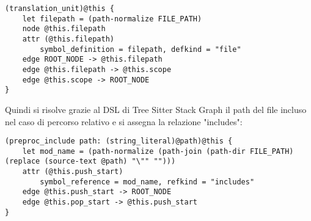 \begin{lstlisting}
(translation_unit)@this {
    let filepath = (path-normalize FILE_PATH)
    node @this.filepath
    attr (@this.filepath)
        symbol_definition = filepath, defkind = "file"
    edge ROOT_NODE -> @this.filepath
    edge @this.filepath -> @this.scope
    edge @this.scope -> ROOT_NODE
}
\end{lstlisting}

Quindi si risolve grazie al DSL di Tree Sitter Stack Graph il path del file incluso nel caso di percorso relativo e si assegna la relazione "includes":

\begin{lstlisting}
(preproc_include path: (string_literal)@path)@this {
    let mod_name = (path-normalize (path-join (path-dir FILE_PATH) (replace (source-text @path) "\"" "")))
    attr (@this.push_start)
        symbol_reference = mod_name, refkind = "includes"
    edge @this.push_start -> ROOT_NODE
    edge @this.pop_start -> @this.push_start
}
\end{lstlisting}


